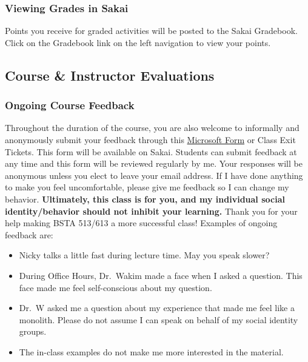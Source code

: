\documentclass[
  letterpaper,
  DIV=11,
  numbers=noendperiod]{scrartcl}
\begin{document}
\subsubsection{Viewing Grades in Sakai}\label{viewing-grades-in-sakai}

Points you receive for graded activities will be posted to the Sakai
Gradebook. Click on the Gradebook link on the left navigation to view
your points.

\subsection{Course \& Instructor
Evaluations}\label{course-instructor-evaluations}

\subsubsection{Ongoing Course Feedback}\label{ongoing-course-feedback}

Throughout the duration of the course, you are also welcome to
informally and anonymously submit your feedback through this
\href{https://forms.office.com/Pages/ResponsePage.aspx?id=V3lz4rj6fk2U9pvWr59xWFMopmPUjRtDiHLswhgacNhUQlpLVUsyVUE3TU5ZNThJR0xCRDMyRjJOSC4u}{Microsoft
Form} or Class Exit Tickets. This form will be available on Sakai.
Students can submit feedback at any time and this form will be reviewed
regularly by me. Your responses will be anonymous unless you elect to
leave your email address. If I have done anything to make you feel
uncomfortable, please give me feedback so I can change my behavior.
\textbf{Ultimately, this class is for you, and my individual social
identity/behavior should not inhibit your learning.} Thank you for your
help making BSTA 513/613 a more successful class! Examples of ongoing
feedback are:

\begin{itemize}
\item
  Nicky talks a little fast during lecture time. May you speak slower?
\item
  During Office Hours, Dr.~Wakim made a face when I asked a question.
  This face made me feel self-conscious about my question.
\item
  Dr.~W asked me a question about my experience that made me feel like a
  monolith. Please do not assume I can speak on behalf of my social
  identity groups.
\item
  The in-class examples do not make me more interested in the material.
\end{itemize}
\end{document}
